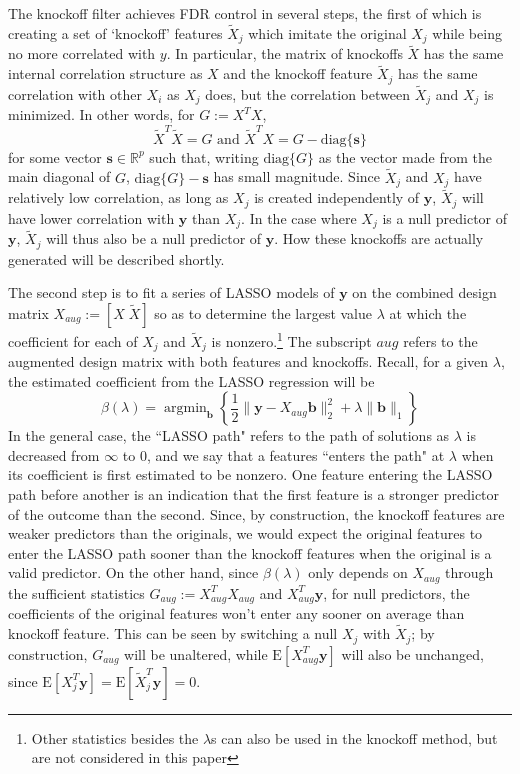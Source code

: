 \documentclass[11pt]{article}
\newcommand{\R}{\mathbb{R}}
\newcommand{\E}{\mathrm{E}}
\newcommand{\diag}[1]{\mathrm{diag}\{#1\}}
\theoremstyle{definition}
\DeclareMathOperator*{\argmin}{arg\min}
\begin{document}
    The knockoff filter achieves FDR control in several steps, the first of which is creating a set of `knockoff' features $\tilde X_j$ which imitate the original $X_j$ while being no more correlated with $y$. In particular, the matrix of knockoffs $\tilde X$ has the same internal correlation structure as $X$ and the knockoff feature $\tilde X_j$ has the same correlation with other $X_i$ as $X_j$ does, but the correlation between $\tilde X_j$ and $X_j$ is minimized. In other words, for $G := X^TX$, 
    \[ \tilde X^T\tilde X=G \textrm{ and } \tilde X^T X = G - \diag{\mathbf s}\]
    for some vector $\mathbf{s}\in \R^p$ such that, writing $\diag{G}$ as the vector made from the main diagonal of $G$, $\diag{G} - \mathbf s$ has small magnitude. Since $\tilde X_j$ and $X_j$ have relatively low correlation, as long as $X_j$ is created independently of $\mathbf y$, $\tilde X_j$ will have lower correlation with $\mathbf y$ than $X_j$. In the case where $X_j$ is a null predictor of $\mathbf y$, $\tilde X_j$ will thus also be a null predictor of $\mathbf y$. How these knockoffs are actually generated will be described shortly.\par
    The second step is to fit a series of LASSO models of $\mathbf y$ on the combined design matrix $X_{aug}:=[X \; \tilde X]$ so as to determine the largest value $\lambda$ at which the coefficient for each of $X_j$ and $\tilde X_j$ is nonzero.\footnote{Other statistics besides the $\lambda$s can also be used in the knockoff method, but are not considered in this paper} The subscript $aug$ refers to the augmented design matrix with both features and knockoffs. Recall, for a given $\lambda$, the estimated coefficient from the LASSO regression will be 
    \[ \beta(\lambda) = \argmin_\mathbf b \left\{\frac{1}{2}\|\mathbf y - X_{aug}\mathbf b\|^2_2 + \lambda\|\mathbf{b}\|_1 \right\}\]
    In the general case, the ``LASSO path" refers to the path of solutions as $\lambda$ is decreased from $\infty$ to $0$, and we say that a features ``enters the path" at $\lambda$ when its coefficient is first estimated to be nonzero. One feature entering the LASSO path before another is an indication that the first feature is a stronger predictor of the outcome than the second. Since, by construction, the knockoff features are weaker predictors than the originals, we would expect the original features to enter the LASSO path sooner than the knockoff features when the original is a valid predictor. On the other hand, since $\beta(\lambda)$ only depends on $X_{aug}$ through the sufficient statistics $G_{aug}:=X_{aug}^TX_{aug}$ and $X_{aug}^T\mathbf y$, for null predictors, the coefficients of the original features won't enter any sooner on average than knockoff feature. This can be seen by switching a null $X_j$ with $\tilde X_j$; by construction, $G_{aug}$ will be unaltered, while $\E\left[X_{aug}^T\mathbf y\right]$ will also be unchanged, since $\E[X_j^T\mathbf y]=\E[\tilde X_j^T\mathbf y]=0$. \par
\end{document}
